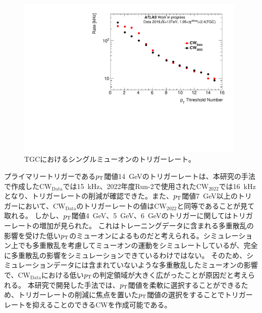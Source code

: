 \begin{figure}[tb]
  \centering
  \includegraphics[clip, width=11cm]{fig/5/15rate_re.pdf}
  \caption{TGCにおけるシングルミューオンのトリガーレート。}
  \label{fig:Ratev05v06}
\end{figure}
プライマリートリガーである$p_{\rm{T}}$閾値14~GeVのトリガーレートは、本研究の手法で作成した$\mathrm{CW_{Data}}$では15~kHz、2022年度Run-2で使用された$\mathrm{CW_{2022}}$では16~kHzとなり、トリガーレートの削減が確認できた。また、$p_{\rm{T}}$閾値7~GeV以上のトリガーにおいて、$\mathrm{CW_{Data}}$のトリガーレートの値は$\mathrm{CW_{2022}}$と同等であることが見て取れる。
しかし、$p_{\rm{T}}$閾値4~GeV、5~GeV、6~GeVのトリガーに関してはトリガーレートの増加が見られた。
これはトレーニングデータに含まれる多重散乱の影響を受けた低い$p_{\rm{T}}$のミューオンによるものだと考えられる。シミュレーション上でも多重散乱を考慮してミューオンの運動をシミュレートしているが、完全に多重散乱の影響をシミュレーションできているわけではない。
そのため、シミュレーションデータには含まれていないような多重散乱したミューオンの影響で、$\mathrm{CW_{Data}}$における低い$p_{\rm{T}}$の判定領域が大きく広がったことが原因だと考えられる。
本研究で開発した手法では、$p_{\rm{T}}$閾値を柔軟に選択することができるため、トリガーレートの削減に焦点を置いた$p_{\rm{T}}$閾値の選択をすることでトリガーレートを抑えることのできるCWを作成可能である。





